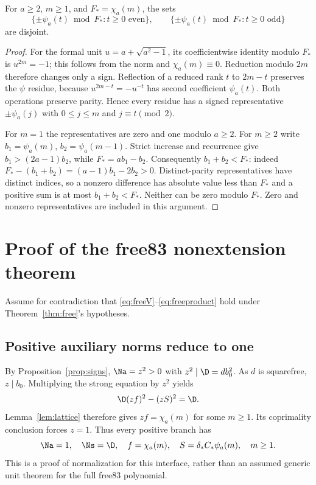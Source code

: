\begin{lemma}\label{lem:parity}
For $a\ge2$, $m\ge1$, and $F_* =\chi_a(m)$, the sets
\[
 \{\pm\psi_a(t)\bmod F_*:t\ge0\text{ even}\},\qquad
 \{\pm\psi_a(t)\bmod F_*:t\ge0\text{ odd}\}
\]
are disjoint.
\end{lemma}
\begin{proof}
For the formal unit $u=a+\sqrt{a^2-1}$, its coefficientwise
identity modulo $F_*$ is $u^{2m}=-1$; this follows from the
norm and $\chi_a(m)\equiv0$. Reduction modulo $2m$ therefore
changes only a sign. Reflection of a reduced rank $t$ to $2m-t$
preserves the $\psi$ residue, because
$u^{2m-t}=-u^{-t}$ has second coefficient $\psi_a(t)$.
Both operations preserve parity. Hence every residue has a signed
representative $\pm\psi_a(j)$ with $0\le j\le m$ and
$j\equiv t\pmod2$.

For $m=1$ the representatives are zero and one modulo $a\ge2$.
For $m\ge2$ write $b_1=\psi_a(m)$, $b_2=\psi_a(m-1)$.
Strict increase and recurrence give $b_1>(2a-1)b_2$, while
$F_*=ab_1-b_2$. Consequently $b_1+b_2<F_*$:
indeed $F_*-(b_1+b_2)=(a-1)b_1-2b_2>0$.
Distinct-parity representatives have distinct indices, so a nonzero
difference has absolute value less than $F_*$ and a positive sum is
at most $b_1+b_2<F_*$. Neither can be zero modulo $F_*$.
Zero and nonzero representatives are included in this argument.
\end{proof}

\section{Proof of the free83 nonextension theorem}
\label{sec:freeproof}
Assume for contradiction that \eqref{eq:freeV}--\eqref{eq:freeproduct}
hold under Theorem~\ref{thm:free}'s hypotheses.

\subsection{Positive auxiliary norms reduce to one}
By Proposition~\ref{prop:signs}, $\Na=z^2>0$ with
$z^2\mid\D=d b_0^2$. As $d$ is squarefree, $z\mid b_0$.
Multiplying the strong equation by $z^2$ yields
\[
 \D(zf)^2-(zS)^2=\D.
\]
Lemma~\ref{lem:lattice} therefore gives $zf=\chi_a(m)$ for
some $m\ge1$. Its coprimality conclusion forces $z=1$.
Thus every positive branch has
\begin{equation}\label{eq:unitbranch}
 \Na=1,\quad \Ns=\D,\quad
 f=\chi_a(m),\quad S=\delta_*C_*\psi_a(m),\quad m\ge1.
\end{equation}
This is a proof of normalization for this interface, rather than an
assumed generic unit theorem for the full free83 polynomial.

